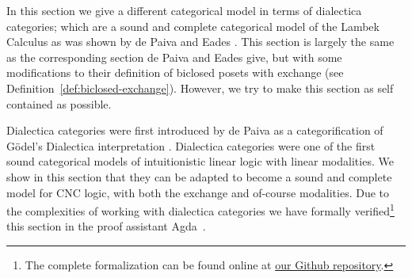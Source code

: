 \newcommand{\Set}{\mathsf{Set}}
\newcommand{\Dial}[2]{\mathsf{Dial}_{#1}(#2)}

In this section we give a different categorical model in terms of
dialectica categories; which are a sound and complete categorical
model of the Lambek Calculus as was shown by de Paiva and Eades
\cite{dePaiva2018}. This section is largely the same as the
corresponding section de Paiva and Eades give, but with some
modifications to their definition of biclosed posets with exchange
(see Definition~\ref{def:biclosed-exchange}).  However, we try to make
this section as self contained as possible.

Dialectica categories were first introduced by de Paiva as a
categorification of G\"odel's Dialectica interpretation
\cite{depaiva1990}.  Dialectica categories were one of the first sound
categorical models of intuitionistic linear logic with linear
modalities.  We show in this section that they can be adapted to
become a sound and complete model for CNC logic, with both the
exchange and of-course modalities.  Due to the complexities of working
with dialectica categories we have formally verified\footnote{The
  complete formalization can be found online at
  \href{https://github.com/MonoidalAttackTrees/non-comm-monads-adjoint-models/tree/master/dialectica-formalization}{our Github repository}.}
this section in the proof assistant Agda~\cite{bove2009}.

